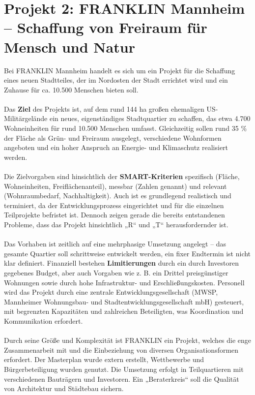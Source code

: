 \documentclass{article}
\begin{document}
\section{Projekt 2: FRANKLIN Mannheim – Schaffung von Freiraum für Mensch und Natur}
Bei FRANKLIN Mannheim handelt es sich um ein Projekt für die Schaffung eines neuen Stadtteiles, der im Nordosten der Stadt errichtet wird 
und ein Zuhause für ca. 10.500 Menschen bieten soll.
\\ \\
Das \textbf{Ziel} des Projekts ist, auf dem rund 144 ha großen ehemaligen US-Militärgelände ein neues, eigenständiges Stadtquartier zu schaffen, 
das etwa 4.700 Wohneinheiten für rund 10.500 Menschen umfasst. Gleichzeitig sollen rund 35 \% der Fläche als Grün- und Freiraum ausgelegt, 
verschiedene Wohnformen angeboten und ein hoher Anspruch an Energie- und Klimaschutz realisiert werden.
\\ \\
Die Zielvorgaben sind hinsichtlich der \textbf{SMART-Kriterien} spezifisch (Fläche, Wohneinheiten, Freiflächenanteil), 
messbar (Zahlen genannt) und relevant (Wohnraumbedarf, Nachhaltigkeit). Auch ist es grundlegend realistisch und terminiert,
da der Entwicklungsprozess eingerichtet und für die einzelnen Teilprojekte befristet ist. Dennoch zeigen gerade die bereits entstandenen Probleme, 
dass das Projekt hinsichtlich „R“ und „T“ herausfordernder ist.
\\ \\
Das Vorhaben ist zeitlich auf eine mehrphasige Umsetzung angelegt – das gesamte Quartier soll schrittweise entwickelt werden, 
ein fixer Endtermin ist nicht klar definiert. Finanziell bestehen \textbf{Limitierungen} durch ein durch Investoren gegebenes Budget, 
aber auch Vorgaben wie z. B. ein Drittel preisgünstiger Wohnungen sowie durch hohe Infrastruktur- und Erschließungskosten. 
Personell wird das Projekt durch eine zentrale Entwicklungsgesellschaft (MWSP, Mannheimer Wohnungsbau- und Stadtentwicklungsgesellschaft mbH) gesteuert, 
mit begrenzten Kapazitäten und zahlreichen Beteiligten, was Koordination und Kommunikation erfordert. 
\\ \\
Durch seine Größe und Komplexität ist FRANKLIN ein Projekt, welches die enge Zusammenarbeit mit und die Einbeziehung von diversen Organisationsformen erfordert. 
Der Masterplan wurde extern erstellt, Wettbewerbe und Bürgerbeteiligung wurden genutzt. 
Die Umsetzung erfolgt in Teilquartieren mit verschiedenen Bauträgern und Investoren. Ein „Beraterkreis“ soll die Qualität von Architektur und Städtebau sichern.
\end{document}
